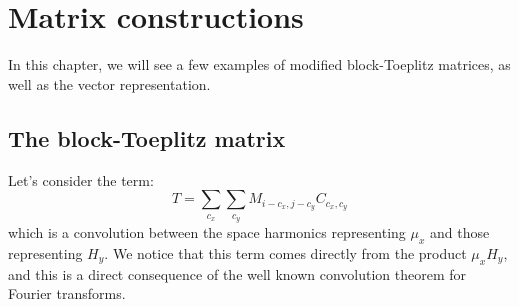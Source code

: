 \chapter{Matrix constructions}
\label{chap_matrix_examples}
\textsf{In this chapter, we will see a few examples of modified block-Toeplitz matrices, as well as the vector representation.}

\section{The block-Toeplitz matrix} 
\label{sec_toeplitz}
Let's consider the term:
\begin{equation}
T=\sum_{c_x}\sum_{c_y}M_{i-c_x,j-c_y}C_{c_x,c_y}
\label{eq_convolution}
\end{equation}
which is a convolution between the space harmonics representing $\mu_x$ and those representing $H_y$. We notice that this term comes directly from the product $\mu_x H_y$, and this is a direct consequence of the well known convolution theorem for Fourier transforms.

